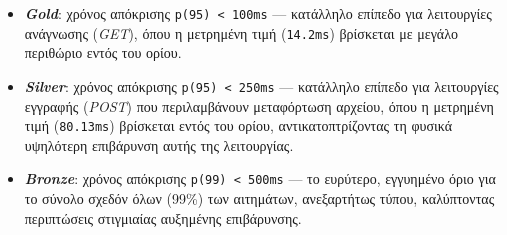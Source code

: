 \begin{itemize}
  \item \textbf{\textit{Gold}}: χρόνος απόκρισης \texttt{p(95) < 100ms} --- κατάλληλο επίπεδο για λειτουργίες ανάγνωσης (\textit{GET}), όπου η μετρημένη τιμή (\texttt{14.2ms}) βρίσκεται με μεγάλο περιθώριο εντός του ορίου.
  \item \textbf{\textit{Silver}}: χρόνος απόκρισης \texttt{p(95) < 250ms} --- κατάλληλο επίπεδο για λειτουργίες εγγραφής (\textit{POST}) που περιλαμβάνουν μεταφόρτωση αρχείου, όπου η μετρημένη τιμή (\texttt{80.13ms}) βρίσκεται εντός του ορίου, αντικατοπτρίζοντας τη φυσικά υψηλότερη επιβάρυνση αυτής της λειτουργίας.
  \item \textbf{\textit{Bronze}}: χρόνος απόκρισης \texttt{p(99) < 500ms} --- το ευρύτερο, εγγυημένο όριο για το σύνολο σχεδόν όλων (99\%) των αιτημάτων, ανεξαρτήτως τύπου, καλύπτοντας περιπτώσεις στιγμιαίας αυξημένης επιβάρυνσης.
\end{itemize}


\begin{center}
\end{center}

